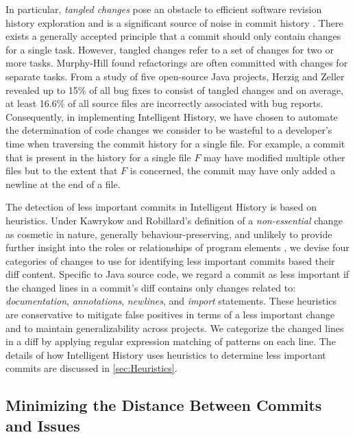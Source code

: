 In particular, \emph{tangled changes} pose an obstacle to efficient software revision history exploration and is a significant source of noise in commit history \cite{herzig_tangled_2013}.
There exists a generally accepted principle that a commit should only contain changes for a single task.
However, tangled changes refer to a set of changes for two or more tasks. 
Murphy-Hill \etal \cite{murphy-hill_refactor_2012} found refactorings are often committed with changes for separate tasks. 
From a study of five open-source Java projects, Herzig and Zeller \cite{herzig_tangled_2013} revealed up to 15\% of all bug fixes to consist of tangled changes and on average, at least 16.6\% of all source files are incorrectly associated with bug reports. 
Consequently, in implementing Intelligent History, we have chosen to automate the determination of code changes we consider to be wasteful to a developer's time when traversing the commit history for a single file. 
For example, a commit that is present in the history for a single file $F$ may have modified multiple other files but to the extent that $F$ is concerned, the commit may have only added a newline at the end of a file.

The detection of less important commits in Intelligent History is based on heuristics.
Under Kawrykow and Robillard's definition of a \emph{non-essential} change as cosmetic in nature, generally behaviour-preserving, and unlikely to provide further insight into the roles or relationships of program elements \cite{kawrykow_non-essential_2011}, we devise four categories of changes to use for identifying less important commits based their diff content.
Specific to Java source code, we regard a commit as less important if the changed lines in a commit's diff contains only changes related to: \emph{documentation}, \emph{annotations}, \emph{newlines}, and \emph{import} statements.
These heuristics are conservative to mitigate false positives in terms of a less important change and to maintain generalizability across projects.
We categorize the changed lines in a diff by applying regular expression matching of patterns on each line.
The details of how Intelligent History uses heuristics to determine less important commits are discussed in \autoref{sec:Heuristics}.

\subsection{Minimizing the Distance Between Commits and Issues}
\label{subsec:Minimize-Commit-Issue-Distance}

